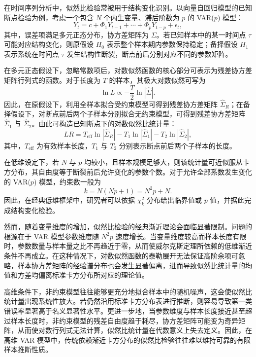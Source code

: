 \documentclass[UTF8,a4paper,12pt]{ctexbook}
\begin{document}
在时间序列分析中，似然比检验常被用于结构变化识别。以向量自回归模型的已知断点检验为例，考虑一个包含 $N$ 个内生变量、滞后阶数为 $p$ 的 VAR($p$) 模型：
\begin{equation}
Y_t=c+\Phi_1Y_{t-1}+\cdots+\Phi_pY_{t-p}+\epsilon_t,
\end{equation}
其中，误差项满足多元正态分布，协方差矩阵为 $\Sigma$。若已知样本中的某一时间点 $\tau$ 可能对应结构变化，则原假设 $H_0$ 表示整个样本期内参数保持稳定；备择假设 $H_1$ 表示系统在时间点 $\tau$ 发生结构性断裂，断点前后分别对应不同的参数矩阵。

在多元正态假设下，忽略常数项后，对数似然函数的核心部分可表示为残差协方差矩阵行列式的函数。对于长度为 $T$ 的样本，其极大对数似然可写为
\begin{equation}
\ln L \propto -\frac{T}{2}\ln|\hat{\Sigma}|.
\end{equation}
因此，在原假设下，利用全样本拟合受约束模型可得到残差协方差矩阵 $\hat{\Sigma}_R$；在备择假设下，对断点前后两个子样本分别拟合无约束模型，可得到残差协方差矩阵 $\hat{\Sigma}_1$ 与 $\hat{\Sigma}_2$。由此可构造已知断点下的对数似然比统计量：
\begin{equation}
LR = T_{\mathrm{eff}}\ln|\hat{\Sigma}_R| - T_1\ln|\hat{\Sigma}_1| - T_2\ln|\hat{\Sigma}_2|,
\end{equation}
其中，$T_{\mathrm{eff}}$ 为有效样本长度，$T_1$ 与 $T_2$ 分别表示断点前后两个子样本的长度。

在低维设定下，若 $N$ 与 $p$ 均较小，且样本规模足够大，则该统计量可近似服从卡方分布，其自由度等于断裂前后允许变化的参数个数。对于允许全部系数发生变化的 VAR($p$) 模型，约束数一般为
\begin{equation}
k = N(Np+1)=N^2p+N.
\end{equation}
因此，在经典低维框架中，研究者可以依据 $\chi_k^2$ 分布给出临界值或 $p$ 值，并据此完成结构变化检验。

然而，随着变量维度的增加，似然比检验的经典渐近理论会面临显著限制。问题的根源在于 VAR 模型参数维度随 $N^2p$ 速度增长。当变量维度较高而样本长度有限时，参数数量与样本量之比不再趋近于零，从而使威尔克斯定理所依赖的低维渐近条件不再成立。在这种情况下，对数似然函数的泰勒展开无法保证高阶余项可忽略，样本协方差矩阵的经验谱分布也会发生显著偏离，进而导致似然比统计量的均值和方差均偏离标准卡方分布所对应的理论值。

高维条件下，非约束模型往往能够更充分地拟合样本中的随机噪声，这会使似然比统计量出现系统性放大。若仍然沿用标准卡方分布表进行推断，则容易导致第一类错误率显著高于名义显著性水平。更进一步地，当参数维度与样本长度接近甚至超过样本长度时，非约束模型的残差自由度趋于耗尽，协方差矩阵可能变为奇异矩阵，从而使对数行列式无法计算，似然比统计量在代数意义上失去定义。因此，在高维 VAR 模型中，传统依赖渐近卡方分布的似然比检验往往难以维持可靠的有限样本推断性质。
\end{document}
